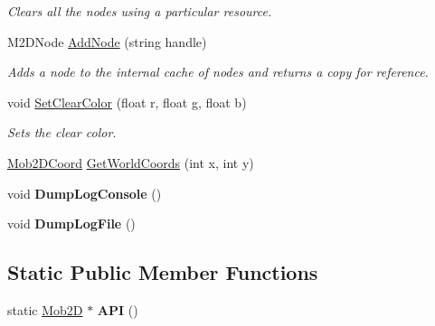 \begin{DoxyCompactItemize}
\begin{DoxyCompactList}\small\item\em Clears all the nodes using a particular resource. \item\end{DoxyCompactList}\item 
\hypertarget{classMob2D_a0130c40bb69d14120a7c773dd3d8edba}{
M2DNode \hyperlink{classMob2D_a0130c40bb69d14120a7c773dd3d8edba}{AddNode} (string handle)}
\label{classMob2D_a0130c40bb69d14120a7c773dd3d8edba}

\begin{DoxyCompactList}\small\item\em Adds a node to the internal cache of nodes and returns a copy for reference. \item\end{DoxyCompactList}\item 
\hypertarget{classMob2D_a5134a75f802895862c060c9b404d58c9}{
void \hyperlink{classMob2D_a5134a75f802895862c060c9b404d58c9}{SetClearColor} (float r, float g, float b)}
\label{classMob2D_a5134a75f802895862c060c9b404d58c9}

\begin{DoxyCompactList}\small\item\em Sets the clear color. \item\end{DoxyCompactList}\item 
\hyperlink{structMob2DCoord}{Mob2DCoord} \hyperlink{classMob2D_a62b6dadda85f5aee74448282d8cae423}{GetWorldCoords} (int x, int y)
\item 
\hypertarget{classMob2D_a8fde6f7f09518cd09435f719803928aa}{
void {\bfseries DumpLogConsole} ()}
\label{classMob2D_a8fde6f7f09518cd09435f719803928aa}

\item 
\hypertarget{classMob2D_acca85bbd2eb2ac9c973d61fbe46905d3}{
void {\bfseries DumpLogFile} ()}
\label{classMob2D_acca85bbd2eb2ac9c973d61fbe46905d3}

\end{DoxyCompactItemize}
\subsection*{Static Public Member Functions}
\begin{DoxyCompactItemize}
\item 
\hypertarget{classMob2D_ab3a4e3a2ac9a3658eda7ad383d19e4a1}{
static \hyperlink{classMob2D}{Mob2D} $\ast$ {\bfseries API} ()}
\label{classMob2D_ab3a4e3a2ac9a3658eda7ad383d19e4a1}

\end{DoxyCompactItemize}
